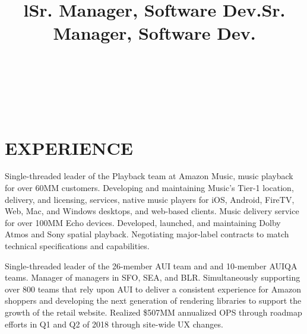\documentclass[margin]{res}
\begin{document}
\bigskip

\address{2528 Chilton Way\\ken@hero.net}
\address{Berkeley, CA 94704\\(310) 383-7981}

\begin{resume}

\begin{format}
\title{l}\\
\\
\body\\
\end{format}

\section{EXPERIENCE}

\title{\textbf{Sr. Manager, Software Dev.}}
\begin{position}
\hspace*{.5cm}Single-threaded leader of the Playback team at Amazon Music, music playback for over 60MM customers. Developing and maintaining Music's Tier-1 location, delivery, and licensing, services, native music players for iOS, Android, FireTV, Web, Mac, and Windows desktops, and web-based clients. Music delivery service for over 100MM Echo devices. Developed, launched, and maintaining Dolby Atmos and Sony spatial playback. Negotiating major-label contracts to match technical specifications and capabilities.
\end{position}

\title{\textbf{Sr. Manager, Software Dev.}}
\begin{position}
\hspace*{.5cm}Single-threaded leader of the 26-member AUI team and and 10-member AUIQA teams. Manager of managers in SFO, SEA, and BLR. Simultaneously supporting over 800 teams that rely upon AUI to deliver a consistent experience for Amazon shoppers and developing the next generation of rendering libraries to support the growth of the retail website. Realized \$507MM annualized OPS through roadmap efforts in Q1 and Q2 of 2018 through site-wide UX changes.
\end{position}


\end{resume}
\end{document}
